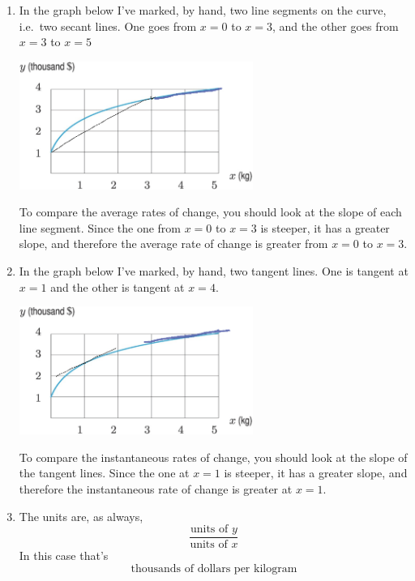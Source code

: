 \documentclass[oneside]{book}
\theoremstyle{definition}
\theoremstyle{solution}
\newtheorem*{solution}{Solution}
\newenvironment{solution}{\vspace{2in}\comment}{\endcomment}
\begin{document}
\begin{solution}
\begin{enumerate}
\item In the graph below I've marked, by hand, two line segments on
  the curve, i.e.\ two secant lines.  One goes from $x=0$ to $x=3$,
  and the other goes from $x=3$ to $x=5$
\begin{center}
  \includegraphics[width=3in]{Images/s2-1prob5markedA.png}
\end{center}
To compare the average rates of change, you should look at the slope of
each line segment.  Since the one from $x=0$ to $x=3$ is steeper, it
has a greater slope, and therefore the average rate of change is
greater from $x=0$ to $x=3$.


\item In the graph below I've marked, by hand, two tangent lines.  One
  is tangent at $x=1$ and the other is tangent at $x=4$.
\begin{center}
  \includegraphics[width=3in]{Images/s2-1prob5markedB.png}
\end{center}
To compare the instantaneous rates of change, you should look at the
slope of the tangent lines. Since the one at $x=1$ is steeper, it has
a greater slope, and therefore the instantaneous rate of change is
greater at $x=1$.

\item 
The units are, as always,
$$
\frac{\text{units of $y$}}{\text{units of $x$}}
$$
In this case that's
$$
\text{thousands of dollars per kilogram}
$$
\end{enumerate}
\end{solution}
\end{document}
